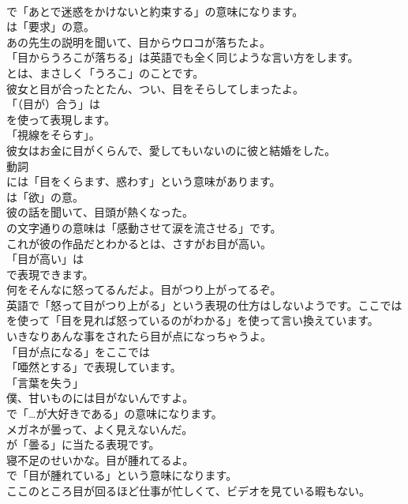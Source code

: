 \documentclass[8pt]{extreport}
\begin{document}
\begin{CJK}{UTF8}{min}
\\	で「あとで迷惑をかけないと約束する」の意味になります。
\\	は「要求」の意。	
\\	あの先生の説明を聞いて、目からウロコが落ちたよ。 
\\	「目からうろこが落ちる」は英語でも全く同じような言い方をします。
\\	とは、まさしく「うろこ」のことです。	
\\	彼女と目が合ったとたん、つい、目をそらしてしまったよ。 
\\	「（目が）合う」は
\\	を使って表現します。
\\	「視線をそらす」。	
\\	彼女はお金に目がくらんで、愛してもいないのに彼と結婚をした。 
\\	動詞
\\	には「目をくらます、惑わす」という意味があります。
\\	は「欲」の意。	
\\	彼の話を聞いて、目頭が熱くなった。 
\\	の文字通りの意味は「感動させて涙を流させる」です。	
\\	これが彼の作品だとわかるとは、さすがお目が高い。 
\\	「目が高い」は 
\\	で表現できます。	
\\	何をそんなに怒ってるんだよ。目がつり上がってるぞ。 
\\	英語で「怒って目がつり上がる」という表現の仕方はしないようです。ここでは
\\	を使って「目を見れば怒っているのがわかる」を使って言い換えています。	
\\	いきなりあんな事をされたら目が点になっちゃうよ。 
\\	「目が点になる」をここでは
\\	「唖然とする」で表現しています。
\\	「言葉を失う」	
\\	僕、甘いものには目がないんですよ。 
\\	で「…が大好きである」の意味になります。	
\\	メガネが曇って、よく見えないんだ。 
\\	が「曇る」に当たる表現です。	
\\	寝不足のせいかな。目が腫れてるよ。 
\\	で「目が腫れている」という意味になります。	
\\	ここのところ目が回るほど仕事が忙しくて、ビデオを見ている暇もない。 

\end{CJK}
\end{document}
